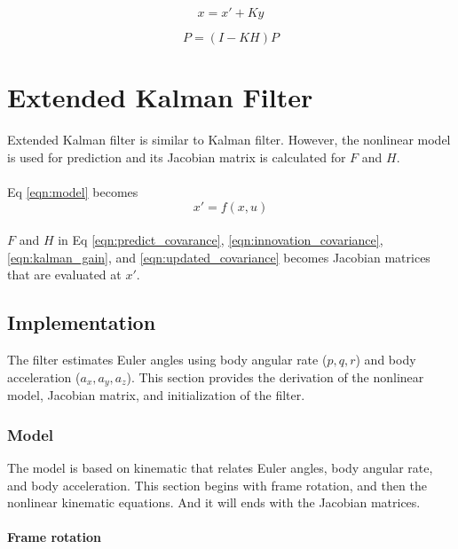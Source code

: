 \documentclass[]{article}
\begin{document}
\begin{equation}
x = x' + Ky\label{eqn:updated_states}
\end{equation}

\begin{equation}
P = (I-KH)P\label{eqn:updated_covariance}
\end{equation}

\section{Extended Kalman Filter}
Extended Kalman filter is similar to Kalman filter. However, the nonlinear model is used for prediction and its Jacobian matrix is calculated for $F$ and $H$.

\paragraph*{}
Eq \eqref{eqn:model} becomes
\begin{equation}
x' = f(x, u)
\end{equation}

\paragraph*{}
$F$ and $H$ in Eq \eqref{eqn:predict_covarance}, \eqref{eqn:innovation_covariance}, \eqref{eqn:kalman_gain}, and \eqref{eqn:updated_covariance} becomes Jacobian matrices that are evaluated at $x'$.

\subsection{Implementation}
The filter estimates Euler angles using body angular rate ($p, q, r$) and body acceleration ($a_x, a_y, a_z$). This section provides the derivation of the nonlinear model, Jacobian matrix, and initialization of the filter.

\subsubsection{Model}
The model is based on kinematic that relates Euler angles, body angular rate, and body acceleration. This section begins with frame rotation, and then the nonlinear kinematic equations. And it will ends with the Jacobian matrices. 

\paragraph{Frame rotation}
\end{document}
